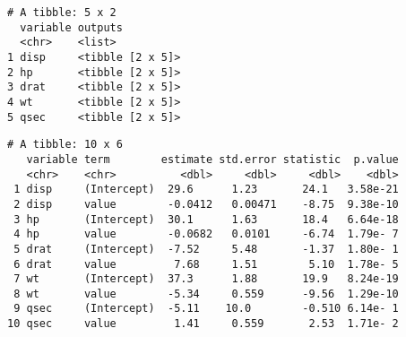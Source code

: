 \documentclass[12pt,letterpaperpaper,openany]{book}
\newenvironment{Shaded}{\begin{snugshade}}{\end{snugshade}}
\newcommand{\DataTypeTok}[1]{\textcolor[rgb]{0.13,0.29,0.53}{#1}}
\newcommand{\KeywordTok}[1]{\textcolor[rgb]{0.13,0.29,0.53}{\textbf{#1}}}
\newcommand{\NormalTok}[1]{#1}
\newcommand{\OperatorTok}[1]{\textcolor[rgb]{0.81,0.36,0.00}{\textbf{#1}}}
\newcommand{\StringTok}[1]{\textcolor[rgb]{0.31,0.60,0.02}{#1}}
\begin{document}
\begin{verbatim}
# A tibble: 5 x 2
  variable outputs         
  <chr>    <list>          
1 disp     <tibble [2 x 5]>
2 hp       <tibble [2 x 5]>
3 drat     <tibble [2 x 5]>
4 wt       <tibble [2 x 5]>
5 qsec     <tibble [2 x 5]>
\end{verbatim}

\begin{Shaded}
\end{Shaded}

\begin{verbatim}
# A tibble: 10 x 6
   variable term        estimate std.error statistic  p.value
   <chr>    <chr>          <dbl>     <dbl>     <dbl>    <dbl>
 1 disp     (Intercept)  29.6      1.23       24.1   3.58e-21
 2 disp     value        -0.0412   0.00471    -8.75  9.38e-10
 3 hp       (Intercept)  30.1      1.63       18.4   6.64e-18
 4 hp       value        -0.0682   0.0101     -6.74  1.79e- 7
 5 drat     (Intercept)  -7.52     5.48       -1.37  1.80e- 1
 6 drat     value         7.68     1.51        5.10  1.78e- 5
 7 wt       (Intercept)  37.3      1.88       19.9   8.24e-19
 8 wt       value        -5.34     0.559      -9.56  1.29e-10
 9 qsec     (Intercept)  -5.11    10.0        -0.510 6.14e- 1
10 qsec     value         1.41     0.559       2.53  1.71e- 2
\end{verbatim}
\end{document}
